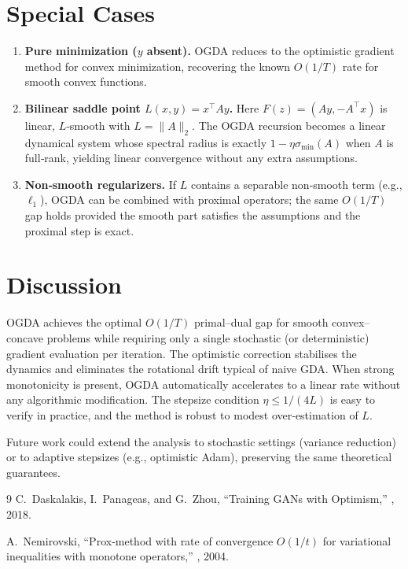 \documentclass{article}
\begin{document}
\section{Special Cases}
\begin{enumerate}[label=(\alph*)]
\item \textbf{Pure minimization ($y$ absent).} OGDA reduces to the optimistic gradient method for convex minimization, recovering the known $O(1/T)$ rate for smooth convex functions.
\item \textbf{Bilinear saddle point $L(x,y)=x^\top Ay$.} Here $F(z)=(Ay,-A^\top x)$ is linear, $L$‑smooth with $L=\|A\|_2$. The OGDA recursion becomes a linear dynamical system whose spectral radius is exactly $1-\eta\sigma_{\min}(A)$ when $A$ is full‑rank, yielding linear convergence without any extra assumptions.
\item \textbf{Non‑smooth regularizers.} If $L$ contains a separable non‑smooth term (e.g., $\ell_1$), OGDA can be combined with proximal operators; the same $O(1/T)$ gap holds provided the smooth part satisfies the assumptions and the proximal step is exact.
\end{enumerate}

\section{Discussion}
OGDA achieves the optimal $O(1/T)$ primal–dual gap for smooth convex–concave problems while requiring only a single stochastic (or deterministic) gradient evaluation per iteration. The optimistic correction stabilises the dynamics and eliminates the rotational drift typical of naive GDA. When strong monotonicity is present, OGDA automatically accelerates to a linear rate without any algorithmic modification. The stepsize condition $\eta\le1/(4L)$ is easy to verify in practice, and the method is robust to modest over‑estimation of $L$.

Future work could extend the analysis to stochastic settings (variance reduction) or to adaptive stepsizes (e.g., optimistic Adam), preserving the same theoretical guarantees.

\begin{thebibliography}{9}
C.~Daskalakis, I.~Panageas, and G.~Zhou,
\newblock ``Training GANs with Optimism,''
, 2018.

A.~Nemirovski,
\newblock ``Prox-method with rate of convergence $O(1/t)$ for variational inequalities with monotone operators,''
, 2004.
\end{thebibliography}
\end{document}
